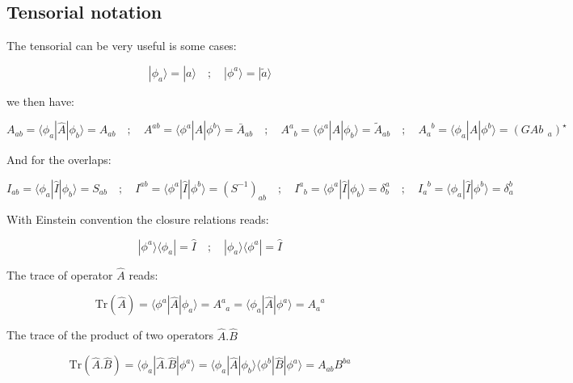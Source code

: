 \documentclass{article}
\newcommand{\bra}[1]{\langle #1|}
\newcommand{\ket}[1]{|#1\rangle}
\newcommand{\op}[1]{\hat{#1}}
\begin{document}
\smallskip


\noindent





\subsection{Tensorial notation}

\noindent
The tensorial can be very useful is some cases:

\[ \ket{\phi_a}=\ket{a} \quad ; \quad \ket{\phi^a}=\ket{\tilde{a}} \]

\noindent
we then have:

\[ A_{ab}=\bra{\phi_a}\op{A}\ket{\phi_b}=A_{ab} \quad ; \quad  
A^{ab}=\bra{\phi^a}\op{A}\ket{\phi^b}=\bar{A}_{ab} \quad ; \quad  
A^{a}_{\; \;b}=\bra{\phi^a}\op{A}\ket{\phi_b}=\tilde{A}_{ab} \quad ; \quad 
A_{a}^{\; \;b}=\bra{\phi_a}\op{A}\ket{\phi^b}=( GA{b}_{\; \;a})^{\star}
 \]

\noindent
And for the overlaps:

\[ I_{ab}=\bra{\phi_a}\op{I}\ket{\phi_b}=S_{ab} \quad ; \quad  
I^{ab}=\bra{\phi^a}\op{I}\ket{\phi^b}=(S^{-1})_{ab} \quad ; \quad  
I^{a}_{\; \;b}=\bra{\phi^a}\op{I}\ket{\phi_b}=\delta^{a}_{b} \quad ; \quad 
I_{a}^{\; \;b}=\bra{\phi_a}\op{I}\ket{\phi^b}=\delta^{b}_{a}
 \]

\noindent
With Einstein convention the closure relations reads:

\[ \ket{\phi^a}\bra{\phi_a}=\op{I} \quad ; \quad  \ket{\phi_a}\bra{\phi^a}=\op{I}\]

\noindent
The trace of operator $\op{A}$ reads:

\[ \text{Tr}(\op{A})= \bra{\phi^a}\op{A}\ket{\phi_a}=A^{a}_{\; \;a}= \bra{\phi_a}\op{A}\ket{\phi^a}=A_{a}^{\; \;a}\]


\noindent
The trace of the product of two operators $\op{A}.\op{B}$

\[ \text{Tr}(\op{A}.\op{B})= \bra{\phi_a}\op{A}.\op{B}\ket{\phi^a}=
\bra{\phi_a}\op{A} \ket{\phi_b}\bra{\phi^b}\op{B}\ket{\phi^a}= A_{ab}B^{ba}\]
\end{document}
